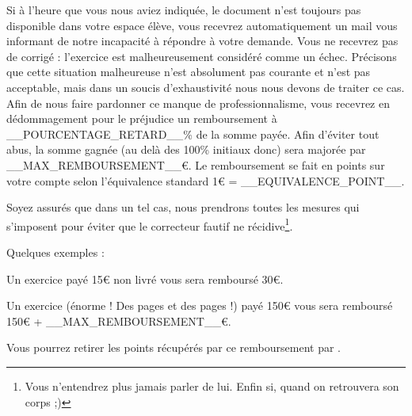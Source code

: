﻿Si à l'heure que vous nous aviez indiquée, le document n'est toujours pas disponible dans votre espace élève, vous recevrez automatiquement un mail vous informant de notre incapacité à répondre à votre demande. Vous ne recevrez \b{pas} de corrigé : l'exercice est malheureusement considéré comme un échec. Précisons que cette situation malheureuse n'est absolument pas courante et n'est pas acceptable, mais dans un soucis d'exhaustivité nous nous devons de traiter ce cas.
Afin de nous faire pardonner ce manque de professionnalisme, vous recevrez en dédommagement pour le préjudice un remboursement à __POURCENTAGE_RETARD__\% de la somme payée. Afin d'éviter tout abus, la somme gagnée (au delà des 100\% initiaux donc) sera majorée par __MAX_REMBOURSEMENT__€. Le remboursement se fait en points sur votre compte selon l'équivalence standard 1€ = __EQUIVALENCE_POINT__.

Soyez assurés que dans un tel cas, nous prendrons toutes les mesures qui s'imposent pour éviter que le correcteur fautif ne récidive\footnote{Vous n'entendrez plus jamais parler de lui. Enfin si, quand on retrouvera son corps ;)}.

Quelques exemples :
\item Un exercice payé 15€ non livré vous sera remboursé 30€.
\item Un exercice (énorme ! Des pages et des pages !) payé 150€ vous sera remboursé 150€ + __MAX_REMBOURSEMENT__€.

Vous pourrez retirer les points récupérés par ce remboursement par .